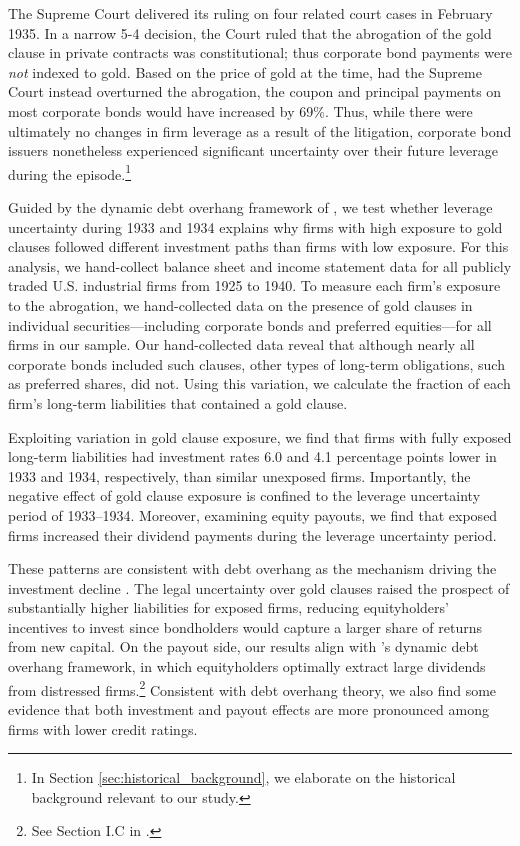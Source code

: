 The Supreme Court delivered its ruling on four related court cases in February 1935. In a narrow 5-4 decision, the Court ruled that the abrogation of the gold clause in private contracts was constitutional; thus corporate bond payments were \textit{not} indexed to gold. Based on the price of gold at the time, had the Supreme Court instead overturned the abrogation, the coupon and principal payments on most corporate bonds would have increased by 69\%. Thus, while there were ultimately no changes in firm leverage as a result of the litigation, corporate bond issuers nonetheless experienced significant uncertainty over their future leverage during the episode.\footnote{In Section \ref{sec:historical_background}, we elaborate on the historical background relevant to our study.}
	
Guided by the dynamic debt overhang framework of \cite{Hennessy2004}, we test whether leverage uncertainty during 1933 and 1934 explains why firms with high exposure to gold clauses followed different investment paths than firms with low exposure. For this analysis, we hand-collect balance sheet and income statement data for all publicly traded U.S. industrial firms from 1925 to 1940. To measure each firm's exposure to the abrogation, we hand-collected data on the presence of gold clauses in individual securities---including corporate bonds and preferred equities---for all firms in our sample. Our hand-collected data reveal that although nearly all corporate bonds included such clauses, other types of long-term obligations, such as preferred shares, did not. Using this variation, we calculate the fraction of each firm's long-term liabilities that contained a gold clause.

Exploiting variation in gold clause exposure, we find that firms with fully exposed long-term liabilities had investment rates 6.0 and 4.1 percentage points lower in 1933 and 1934, respectively, than similar unexposed firms. Importantly, the negative effect of gold clause exposure is confined to the leverage uncertainty period of 1933--1934. Moreover, examining equity payouts, we find that exposed firms increased their dividend payments during the leverage uncertainty period. 

These patterns are consistent with debt overhang as the mechanism driving the investment decline \citep{Myers1977, Hennessy2004}. The legal uncertainty over gold clauses raised the prospect of substantially higher liabilities for exposed firms, reducing equityholders' incentives to invest since bondholders would capture a larger share of returns from new capital. On the payout side, our results align with \cite{Hennessy2004}'s dynamic debt overhang framework, in which equityholders optimally extract large dividends from distressed firms.\footnote{See Section I.C in \cite{Hennessy2004}.} Consistent with debt overhang theory, we also find some evidence that both investment and payout effects are more pronounced among firms with lower credit ratings.

